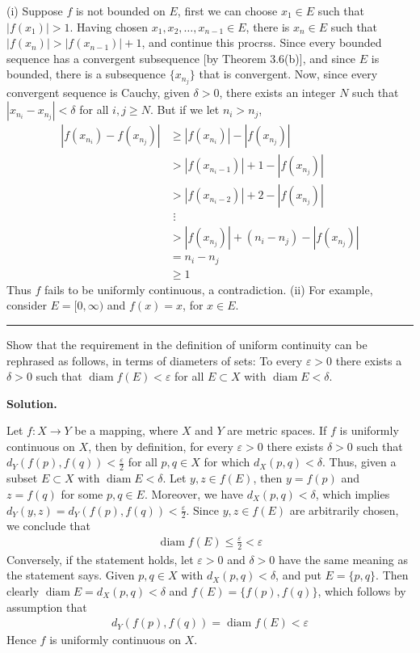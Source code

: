 \documentclass[12pt]{article}
\theoremstyle{definition}
\begin{document}
(i) Suppose $f$ is not bounded on $E$, first we can choose $x_1\in E$ such that $\left\vert f(x_1)\right\vert>1$. Having chosen $x_1,x_2,\ldots,x_{n-1}\in E$, there is $x_n\in E$ such that $\left\vert f(x_n)\right\vert>\left\vert f(x_{n-1})\right\vert+1$, and continue this procrss. Since every bounded sequence has a convergent subsequence [by Theorem 3.6(b)], and since $E$ is bounded, there is a subsequence $\{x_{n_j}\}$ that is convergent. Now, since every convergent sequence is Cauchy, given $\delta>0$, there exists an integer $N$ such that $\left\vert x_{n_i}-x_{n_j}\right\vert<\delta$ for all $i,j\ge N$. But if we let $n_i>n_j$,
\begin{align*}
\left\vert f(x_{n_i})-f(x_{n_j})\right\vert
&\ge \left\vert f(x_{n_i})\right\vert-\left\vert f(x_{n_j})\right\vert \\
&>\left\vert f(x_{n_i-1})\right\vert+1-\left\vert f(x_{n_j})\right\vert \\
&>\left\vert f(x_{n_i-2})\right\vert+2-\left\vert f(x_{n_j})\right\vert \\
&\,\,\vdots \\
&>\left\vert f(x_{n_j})\right\vert+(n_i-n_j)-\left\vert f(x_{n_j})\right\vert \\
&=n_i-n_j \\
&\ge 1
\end{align*}
Thus $f$ fails to be uniformly continuous, a contradiction.
(ii) For example, consider $E=[0,\infty)$ and $f(x)=x$, for $x\in E$.



\bigskip\noindent\hrule\bigskip

Show that the requirement in the definition of uniform continuity can be rephrased as follows, in terms of diameters of sets: To every $\varepsilon>0$ there exists a $\delta>0$ such that $\operatorname{diam}f(E)<\varepsilon$ for all $E\subset X$ with $\operatorname{diam}E<\delta$.

\smallskip
\noindent\textbf{Solution.}\quad

Let $f:X\to Y$ be a mapping, where $X$ and $Y$ are metric spaces. If $f$ is uniformly continuous on $X$, then by definition, for every $\varepsilon>0$ there exists $\delta>0$ such that $d_Y(f(p),f(q))<\frac{\varepsilon}{2}$ for all $p,q\in X$ for which $d_X(p,q)<\delta$. Thus, given a subset $E\subset X$ with $\operatorname{diam}E<\delta$. Let $y,z\in f(E)$, then $y=f(p)$ and $z=f(q)$ for some $p,q\in E$. Moreover, we have $d_X(p,q)<\delta$, which implies $d_Y(y,z)=d_Y(f(p),f(q))<\frac{\varepsilon}{2}$. Since $y,z\in f(E)$ are arbitrarily chosen, we conclude that
\begin{align*}
\operatorname{diam}f(E)\le\frac{\varepsilon}{2}<\varepsilon
\end{align*}
Conversely, if the statement holds, let $\varepsilon>0$ and $\delta>0$ have the same meaning as the statement says. Given $p,q\in X$ with $d_X(p,q)<\delta$, and put $E=\{p,q\}$. Then clearly $\operatorname{diam}E=d_X(p,q)<\delta$ and $f(E)=\{f(p),f(q)\}$, which follows by assumption that
\begin{align*}
d_Y(f(p),f(q))=\operatorname{diam}f(E)<\varepsilon
\end{align*}
Hence $f$ is uniformly continuous on $X$.
\end{document}

